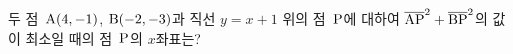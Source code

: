 두 점~$\mathrm{A}(4{,}\mkern3mu\mathopen{}-1)$, $\mathrm{B}(-2{,}\mkern3mu\mathopen{}-3)$과 직선 $y=x+1$ 위의 점~$\mathrm{P}$에 대하여 $\overline{\mathrm{AP}}^2+\overline{\mathrm{BP}}^2$의 값이 최소일 때의 점~$\mathrm{P}$의 $x$좌표는?
